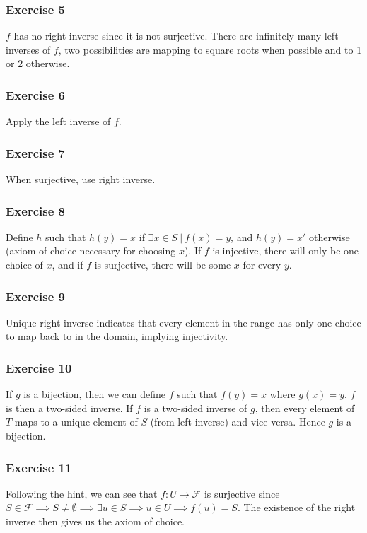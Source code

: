 \subsubsection{Exercise 5}
$f$ has no right inverse since it is not surjective.
There are infinitely many left inverses of $f$, two possibilities are 
mapping to square roots when possible and to 1 or 2 otherwise.

\subsubsection{Exercise 6}
Apply the left inverse of $f$.

\subsubsection{Exercise 7}
When surjective, use right inverse.

\subsubsection{Exercise 8}
Define $h$ such that $h(y) = x$ if $\exists x \in S \: | \: f(x) = y$, and $h(y) = x'$ otherwise
(axiom of choice necessary for choosing $x$). If $f$ is injective, there will only be
one choice of $x$, and if $f$ is surjective, there will be some $x$ for every $y$.

\subsubsection{Exercise 9}
Unique right inverse indicates that every element in the range has
only one choice to map back to in the domain, implying injectivity.

\subsubsection{Exercise 10}
If $g$ is a bijection, then we can define $f$ such that $f(y) = x$ 
where $g(x) = y$. $f$ is then a two-sided inverse.
If  $f$ is a two-sided inverse of $g$, then every element of $T$ maps to a
unique element of $S$ (from left inverse) and vice versa. Hence $g$ is
a bijection.

\subsubsection{Exercise 11}
Following the hint, we can see that $f: U \to \mathcal{F}$ is surjective since
$S \in \mathcal{F} \implies S \neq \emptyset \implies \exists u \in S \implies u \in U \implies f(u) = S$.
The existence of the right inverse then gives us the axiom of choice.

